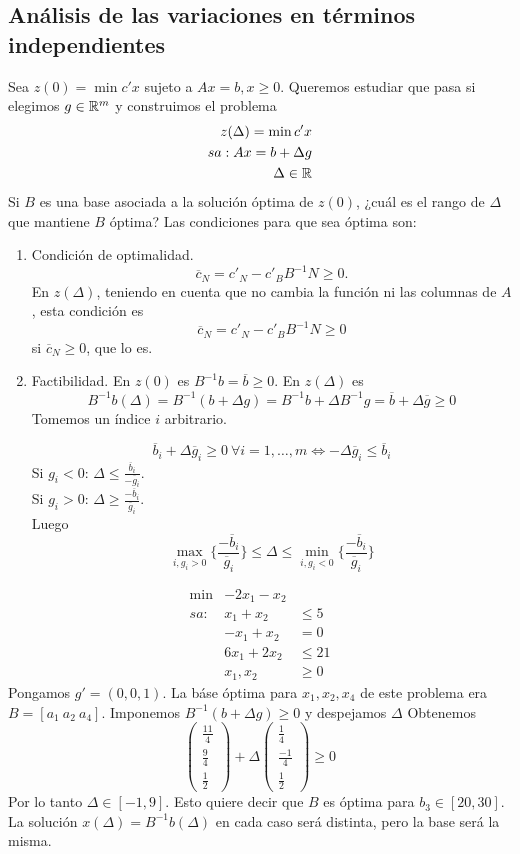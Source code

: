 \documentclass[PM.tex]{subfiles}
\begin{document}
\subsection{Análisis de las variaciones en términos independientes}

Sea $z(0)= \min c'x$ sujeto a $Ax=b, x\geq 0$. Queremos estudiar que pasa si elegimos $g\in\mathbb{R}^m$ y construimos el problema
\begin{align*}
z(\Delta)=\min c'x\\
sa: Ax=b+\Delta g\\
\Delta\in\mathbb{R}
\end{align*}
Si $B$ es una base asociada a la solución óptima de $z(0)$, ¿cuál es el rango de $\Delta$ que mantiene $B$ óptima? Las condiciones para que sea óptima son:
\begin{enumerate}
\item Condición de optimalidad. \[\overline{c}_N=c'_N-c'_B B^{-1}N\geq 0.\]
En $z(\Delta)$, teniendo en cuenta que no cambia la función ni las columnas de $A$, esta condición es
\[\overline{c}_N=c'_N-c'_B B^{-1}N\geq 0\] si $\overline{c}_N\geq 0$, que lo es. 
\item Factibilidad. En $z(0)$ es $B^{-1}b=\overline{b}\geq 0$. En $z(\Delta)$ es 
\[B^{-1}b(\Delta)=B^{-1}(b+\Delta  g)=B^{-1}b+\Delta B^{-1}g=\overline{b}+\Delta\overline{g}\geq 0\]
Tomemos un índice $i$ arbitrario.

\[\overline{b}_i+\Delta\overline{g}_i\geq 0\ \forall i=1,\dots, m\Leftrightarrow -\Delta\overline{g}_i\leq\overline{b}_i\]
Si $g_i<0$: $\Delta\leq\frac{\overline{b}_i}{-\overline{g}_i}$.\\
Si $g_i>0$: $\Delta\geq\frac{-\overline{b}_i}{\overline{g}_i}$.\\
Luego
\[\max_{i, g_i>0}\{\frac{-\overline{b}_i}{\overline{g}_i}\}\leq\Delta \leq \min_{i,g_i<0}\{\frac{-\overline{b}_i}{\overline{g}_i}\}\]
\end{enumerate}
\begin{example}
\begin{align*}
\min & -2x_1-x_2 &\\
sa: & x_1+x_2 &\leq 5\\
    & -x_1+x_2 & =0\\
    & 6x_1+2x_2 & \leq 21\\
    & x_1,x_2 & \geq 0
\end{align*}
Pongamos $g'=(0,0,1)$. La báse óptima para $x_1,x_2,x_4$ de este problema era $B=[a_1\ a_2\ a_4]$. Imponemos $B^{-1}(b+\Delta g)\geq 0$ y despejamos $\Delta$ Obtenemos
\[
\begin{pmatrix}
\frac{11}{4}\\
\frac{9}{4}\\
\frac{1}{2}
\end{pmatrix}+\Delta\begin{pmatrix}
\frac{1}{4}\\
\frac{-1}{4}\\
\frac{1}{2}
\end{pmatrix}\geq 0
\]
Por lo tanto $\Delta\in [-1,9]$. Esto quiere decir que $B$ es óptima para $b_3\in[20,30]$. La solución $x(\Delta)=B^{-1}b(\Delta)$ en cada caso será distinta, pero la base será la misma.
\end{example}
\end{document}
